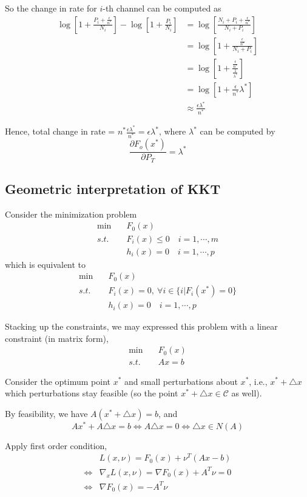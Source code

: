 So the change in rate for $i$-th channel can be computed as
\begin{align*}
\log[1+\frac{P_i+\frac{\epsilon}{n^*}}{N_i}] - \log[1+\frac{P_i}{N_i}] &= \log[\frac{N_i+P_i+\frac{\epsilon}{n^*}}{N_i+P_i}]\\
&= \log[1+\frac{\frac{\epsilon}{n^*}}{N_i+P_i}] \\
&= \log[1+\frac{\frac{\epsilon}{n^*}}{\frac{1}{\lambda^*}}]\\
&= \log[1+\frac{\epsilon}{n^*}\lambda^*]\\
&\approx \frac{\epsilon\lambda^*}{n^*} 
\end{align*}

Hence, total change in rate  = $n^*\frac{\epsilon\lambda^*}{n^*} = \epsilon \lambda^*$, where $\lambda^*$ can be computed by
$$\frac{\partial F_o(x^*)}{\partial P_T} = \lambda^*$$

\subsection{Geometric interpretation of KKT}
Consider the minimization problem
\begin{align*}
\min \quad & F_0(x)\\
s.t. \quad & F_i(x)\leq 0\quad i=1,\cdots,m\\
&h_i(x) = 0\quad i=1,\cdots,p
\end{align*}
which is equivalent to 
\begin{align*}
\min \quad & F_0(x)\\
s.t. \quad & F_i(x)= 0,\ \forall i\in\{i | F_i(x^*)=0\}\\
&h_i(x) = 0\quad i=1,\cdots,p
\end{align*}

Stacking up the constraints, we may expressed this problem with a linear constraint (in matrix form),
\begin{align*}
\min \quad & F_0(x)\\
s.t. \quad & Ax = b
\end{align*}

Consider the optimum point $x^*$ and small perturbations about $x^*$, i.e., $x^*+\triangle x$ which perturbations stay feasible (so the point $x^*+\triangle x \in \mathcal{C}$ as well).

By feasibility, we have $A(x^*+\triangle x) = b$, and
$$Ax^* + A\triangle x = b\Leftrightarrow A\triangle x = 0\Leftrightarrow \triangle x \in N(A)$$

Apply first order condition,
\begin{align*}
&L(x,\nu) = F_0(x) +\nu^T(Ax-b)\\
\Leftrightarrow & \nabla_xL(x,\nu) = \nabla F_0(x) + A^T\nu  = 0\\
\Leftrightarrow & \nabla F_0(x) = -A^T\nu
\end{align*}

